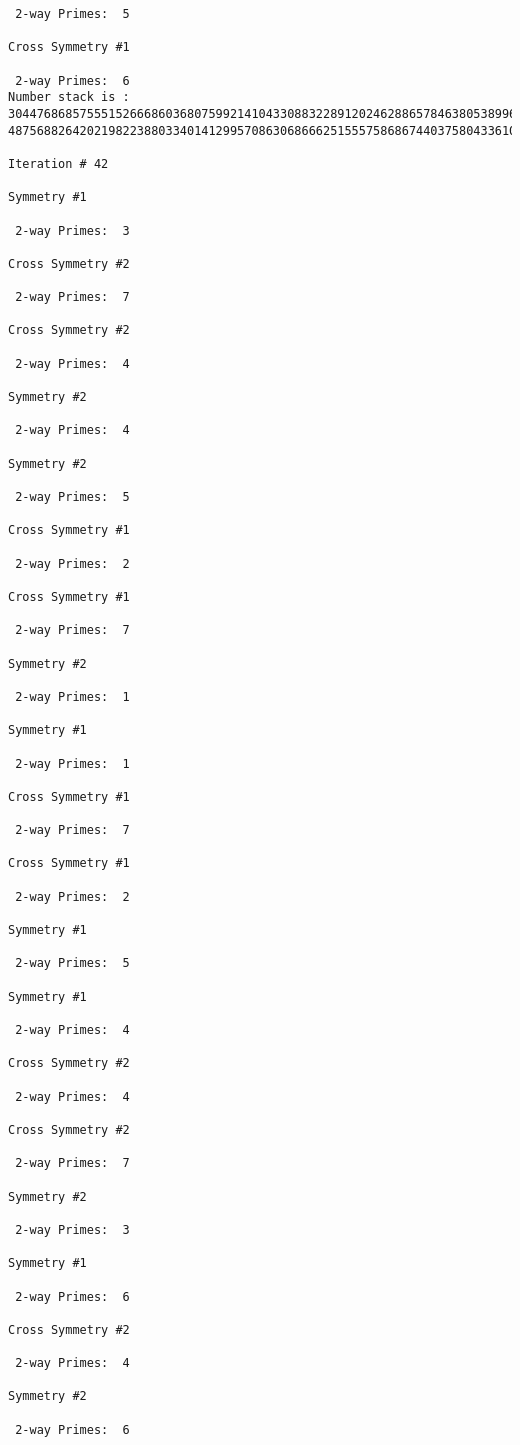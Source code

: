 {{{{\begin{verbatim}
 2-way Primes: 	5

Cross Symmetry #1

 2-way Primes: 	6
Number stack is :
30447686857555152666860368075992141043308832289120246288657846380538996794608835958544046240163340857
48756882642021982238803340141299570863068666251555758686744037580433610426404458595388064976998350836

Iteration #	42

Symmetry #1

 2-way Primes: 	3

Cross Symmetry #2

 2-way Primes: 	7

Cross Symmetry #2

 2-way Primes: 	4

Symmetry #2

 2-way Primes: 	4

Symmetry #2

 2-way Primes: 	5

Cross Symmetry #1

 2-way Primes: 	2

Cross Symmetry #1

 2-way Primes: 	7

Symmetry #2

 2-way Primes: 	1

Symmetry #1

 2-way Primes: 	1

Cross Symmetry #1

 2-way Primes: 	7

Cross Symmetry #1

 2-way Primes: 	2

Symmetry #1

 2-way Primes: 	5

Symmetry #1

 2-way Primes: 	4

Cross Symmetry #2

 2-way Primes: 	4

Cross Symmetry #2

 2-way Primes: 	7

Symmetry #2

 2-way Primes: 	3

Symmetry #1

 2-way Primes: 	6

Cross Symmetry #2

 2-way Primes: 	4

Symmetry #2

 2-way Primes: 	6


\end{verbatim}}}}}
